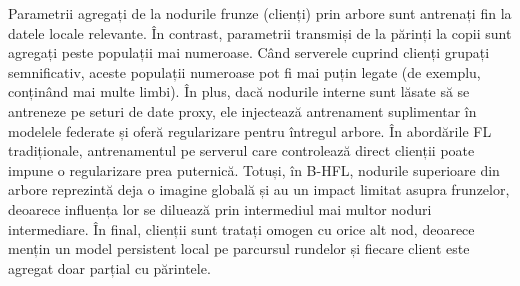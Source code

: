 Parametrii agregați de la nodurile frunze (clienți) prin arbore sunt antrenați fin la datele locale relevante. În contrast, parametrii transmiși de la părinți la copii sunt agregați peste populații mai numeroase. Când serverele cuprind clienți grupați semnificativ, aceste populații numeroase pot fi mai puțin legate (de exemplu, conținând mai multe limbi). În plus, dacă nodurile interne sunt lăsate să se antreneze pe seturi de date proxy, ele injectează antrenament suplimentar în modelele federate și oferă regularizare pentru întregul arbore. În abordările FL tradiționale, antrenamentul pe serverul care controlează direct clienții poate impune o regularizare prea puternică. Totuși, în B-HFL, nodurile superioare din arbore reprezintă deja o imagine globală și au un impact limitat asupra frunzelor, deoarece influența lor se diluează prin intermediul mai multor noduri intermediare. În final, clienții sunt tratați omogen cu orice alt nod, deoarece mențin un model persistent local pe parcursul rundelor și fiecare client este agregat doar parțial cu părintele.

